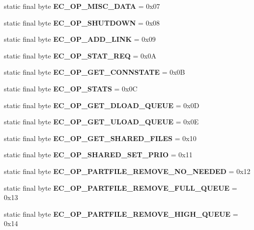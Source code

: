 \begin{DoxyCompactItemize}
\item 
static final byte {\bfseries EC\_\-OP\_\-MISC\_\-DATA} = 0x07\label{interfaceECCodes_a7a85d9cf1284248d89362796fde2d5e0}

\item 
static final byte {\bfseries EC\_\-OP\_\-SHUTDOWN} = 0x08\label{interfaceECCodes_a249a17b45bd85b98f2ffe6011ff1f059}

\item 
static final byte {\bfseries EC\_\-OP\_\-ADD\_\-LINK} = 0x09\label{interfaceECCodes_a93eb9c36cef27a30af424db3c8a790e2}

\item 
static final byte {\bfseries EC\_\-OP\_\-STAT\_\-REQ} = 0x0A\label{interfaceECCodes_af2aa937f15d3f939b61cccd2b72debd4}

\item 
static final byte {\bfseries EC\_\-OP\_\-GET\_\-CONNSTATE} = 0x0B\label{interfaceECCodes_a70e083c7363e2e5604c939598e94c450}

\item 
static final byte {\bfseries EC\_\-OP\_\-STATS} = 0x0C\label{interfaceECCodes_a5fc49b87ad4ceea6caf51a703412f4fc}

\item 
static final byte {\bfseries EC\_\-OP\_\-GET\_\-DLOAD\_\-QUEUE} = 0x0D\label{interfaceECCodes_a54abad64319124c60010c85a8c559def}

\item 
static final byte {\bfseries EC\_\-OP\_\-GET\_\-ULOAD\_\-QUEUE} = 0x0E\label{interfaceECCodes_afff04f804fc7ca715421c2626a9ebf78}

\item 
static final byte {\bfseries EC\_\-OP\_\-GET\_\-SHARED\_\-FILES} = 0x10\label{interfaceECCodes_a83be04c5dc14230904d67bd426b99575}

\item 
static final byte {\bfseries EC\_\-OP\_\-SHARED\_\-SET\_\-PRIO} = 0x11\label{interfaceECCodes_a6769014cc1f597f001feb2ee93394941}

\item 
static final byte {\bfseries EC\_\-OP\_\-PARTFILE\_\-REMOVE\_\-NO\_\-NEEDED} = 0x12\label{interfaceECCodes_a65ffbbb4813e61c04cd1cd2f373914c4}

\item 
static final byte {\bfseries EC\_\-OP\_\-PARTFILE\_\-REMOVE\_\-FULL\_\-QUEUE} = 0x13\label{interfaceECCodes_a4eacdf76f681e3f069408a7822cf8bec}

\item 
static final byte {\bfseries EC\_\-OP\_\-PARTFILE\_\-REMOVE\_\-HIGH\_\-QUEUE} = 0x14\label{interfaceECCodes_a13f271ac859eb3df03e2f3d59a6fa8d4}


\end{DoxyCompactItemize}
